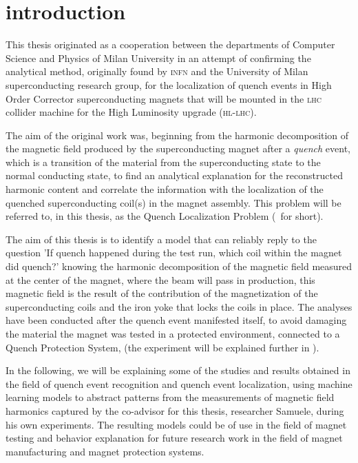 \chapter{introduction}
This thesis originated as a cooperation between the departments of Computer Science and Physics of
Milan University in an attempt of confirming the analytical method, originally found by
\textsc{infn} and the University of Milan superconducting research group, for the localization of
quench events in High Order Corrector superconducting magnets \cite{mariotto2022}
\cite{mariotto2022-generic} that will be mounted in the \textsc{lhc} collider machine for the High
Luminosity upgrade \cite{rossi2024} (\textsc{hl-lhc}).

The aim of the original work was, beginning from the harmonic decomposition of the magnetic
field produced by the superconducting magnet after a \emph{quench} event, which is a transition of the
material from the superconducting state to the normal conducting state, to find an analytical
explanation for the reconstructed harmonic content and correlate the information with the
localization of the quenched superconducting coil(s) in the magnet assembly. This problem will be
referred to, in this thesis, as the Quench Localization Problem (\qlp\ for short).

The aim of this thesis is to identify a model that can reliably reply to the question 'If quench
happened during the test run, which coil within the magnet did quench?' knowing the harmonic
decomposition of the magnetic field measured at the center of the magnet, where the beam will pass
in production, this magnetic field is the result of the contribution of the magnetization of the
superconducting coils and the iron yoke that locks the coils in place. The analyses have been
conducted after the quench event manifested itself, to avoid damaging the material the magnet was
tested in a protected environment, connected to a Quench Protection System, (the experiment will be
explained further in ).

In the following, we will be explaining some of the studies and results obtained in the field of
quench event recognition and quench event localization, using machine learning models to abstract
patterns from the measurements of magnetic field harmonics captured by the co-advisor for this
thesis, researcher Samuele, during his own experiments. The resulting models could be of use in the
field of magnet testing and behavior explanation for future research work in the field of magnet
manufacturing and magnet protection systems.

